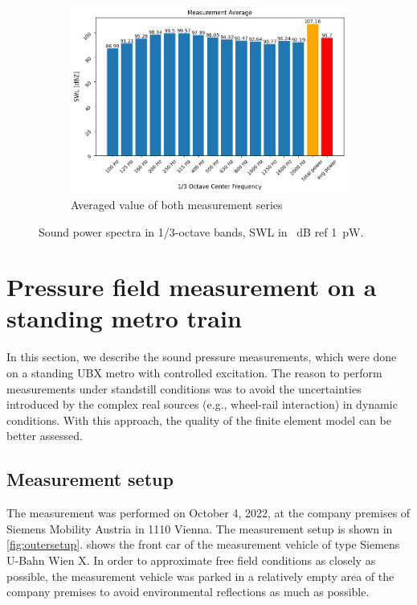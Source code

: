 \begin{figure}[H]\ContinuedFloat
     \centering
     \begin{subfigure}[b]{0.9\textwidth}
         \centering
         \includegraphics[width=\linewidth]{fig/SWL_average.png}
         \caption{Averaged value of both measurement series}
         \label{fig:average_SWL}
     \end{subfigure}
     
        \caption{Sound power spectra in 1/3-octave bands, SWL in \SI{}{\dB} ref \SI{1}{\pico\watt}.}
        \label{fig:SWL}
\end{figure}


\section{Pressure field measurement on a standing metro train}
\label{sec:pressure_field_measurement}

In this section, we describe the sound pressure measurements, which were done on a standing UBX metro with controlled excitation.
The reason to perform measurements under standstill conditions was to avoid the uncertainties introduced by the complex real sources (e.g., wheel-rail interaction) in dynamic conditions. With this approach, the quality of the finite element model can be better assessed.

\subsection*{Measurement setup}

The measurement was performed on October 4, 2022, at the company premises of Siemens Mobility Austria in 1110 Vienna. The measurement setup is shown in \cref{fig:outersetup}.  shows the front car of the measurement vehicle of type Siemens U-Bahn Wien X. In order to approximate free field conditions as closely as possible, the measurement vehicle was parked in a relatively empty area of the company premises to avoid environmental reflections as much as possible.

